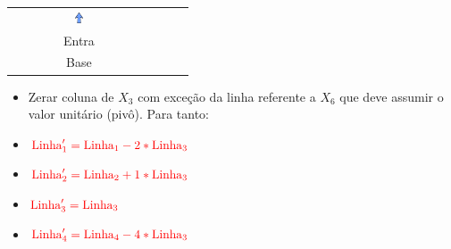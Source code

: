 \begin{frame}
{\begin{table}
\begin{tabular}{c c c c c c c c c c c c}
				& 
				&  
				& 
				& \includegraphics[width=0.3cm,height=0.3cm]{setacima.jpg}
				& 
				& 
				&  
				&  
				& & & \\
				
				& 
				&  
				& 
				& \scriptsize Entra 
				& 
				& 
				&  
				&  
				& & & \\
				
				& 
				&  
				& 
				& \scriptsize Base
				& 
				& 
				&  
				&  
				& & & \\
			\end{tabular}
		\end{table}
		\begin{itemize}
			\item[]  {Zerar coluna de $X_3$ com exceção da linha referente a $X_6$ que deve assumir o valor unitário (pivô). Para tanto:}
			\item[]  {$ \color{red} \text{Linha}'_1 = \text{Linha}_1 - 2*\text{Linha}_3$}
			\item[]  {$ \color{red} \text{Linha}'_2 = \text{Linha}_2 + 1*\text{Linha}_3$}
			\item[]  {$ \color{red} \text{Linha}'_3 = \text{Linha}_3$}
			\item[]    {$ \color{red} \text{Linha}'_4 = \text{Linha}_4 - 4*\text{Linha}_3$}
		\end{itemize}
	}
	

\end{frame}
